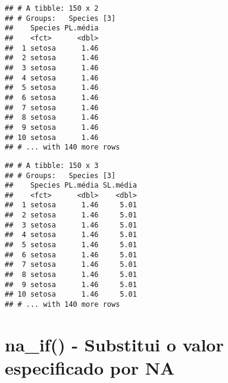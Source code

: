 \documentclass[]{book}
\newenvironment{Shaded}{\begin{snugshade}}{\end{snugshade}}
\newcommand{\DataTypeTok}[1]{\textcolor[rgb]{0.13,0.29,0.53}{#1}}
\newcommand{\KeywordTok}[1]{\textcolor[rgb]{0.13,0.29,0.53}{\textbf{#1}}}
\newcommand{\NormalTok}[1]{#1}
\newcommand{\OperatorTok}[1]{\textcolor[rgb]{0.81,0.36,0.00}{\textbf{#1}}}
\newcommand{\StringTok}[1]{\textcolor[rgb]{0.31,0.60,0.02}{#1}}
\begin{document}
\begin{Shaded}
\end{Shaded}

\begin{verbatim}
## # A tibble: 150 x 2
## # Groups:   Species [3]
##    Species PL.média
##    <fct>      <dbl>
##  1 setosa      1.46
##  2 setosa      1.46
##  3 setosa      1.46
##  4 setosa      1.46
##  5 setosa      1.46
##  6 setosa      1.46
##  7 setosa      1.46
##  8 setosa      1.46
##  9 setosa      1.46
## 10 setosa      1.46
## # ... with 140 more rows
\end{verbatim}

\begin{Shaded}
\end{Shaded}

\begin{verbatim}
## # A tibble: 150 x 3
## # Groups:   Species [3]
##    Species PL.média SL.média
##    <fct>      <dbl>    <dbl>
##  1 setosa      1.46     5.01
##  2 setosa      1.46     5.01
##  3 setosa      1.46     5.01
##  4 setosa      1.46     5.01
##  5 setosa      1.46     5.01
##  6 setosa      1.46     5.01
##  7 setosa      1.46     5.01
##  8 setosa      1.46     5.01
##  9 setosa      1.46     5.01
## 10 setosa      1.46     5.01
## # ... with 140 more rows
\end{verbatim}

\hypertarget{na_if---substitui-o-valor-especificado-por-na}{%
\section{na\_if() - Substitui o valor especificado por NA}\label{na_if---substitui-o-valor-especificado-por-na}}
\end{document}

